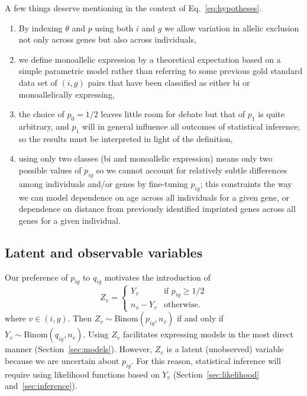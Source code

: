 \documentclass[letterpaper]{article}
\begin{document}
A few things deserve mentioning in the context of Eq.~\ref{eq:hypotheses}.
\begin{enumerate}
\item By indexing \(\theta\) and \(p\) using both \(i\) and \(g\) we allow variation
in allelic exclusion not only across genes but also across individuals,
\item we define monoallelic expression by a theoretical expectation based on a
simple parametric model rather than referring to some previous gold standard
data set of \((i,g)\) pairs that have been classified as either bi or monoallelically
expressing,
\item the choice of \(p_0=1/2\) leaves little room for debate but that of
\(p_1\) is quite arbitrary, and \(p_1\) will in general influence all outcomes of
statistical inference; so the results must be interpreted in light of the
definition,
\item using only two classes (bi and monoallelic expression) means only two possible
values of \(p_{ig}\) so we cannot account for  
relatively subtle differences among individuals and/or genes by fine-tuning
\(p_{ig}\); this constraints the way we can model dependence on age across all
individuals for a given gene, or dependence on distance from previously
identified imprinted genes across all genes for a given individual.
\end{enumerate}

\subsection{Latent and observable variables}

Our preference of \(p_{ig}\) to \(q_{ig}\) motivates the introduction
of
\begin{equation}
\label{eq:Z-def}
Z_v =
\begin{cases}
Y_v & \text{if } p_{ig} \ge 1/2 \\
n_v-Y_v & \text{otherwise}.
\end{cases}
\end{equation}
where \(v\in(i,g)\).
Then \(Z_v\sim\mathrm{Binom}(p_{ig},n_v)\) if and only if
\(Y_v\sim\mathrm{Binom}(q_{ig},n_v)\).  Using \(Z_v\) facilitates
expressing models in the most direct manner (Section~\ref{sec:models}).  However, \(Z_v\) is a latent
(unobserved) variable because we are uncertain about \(p_{ig}\).  For
this reason, statistical inference will require using likelihood functions
based on \(Y_v\) (Section~\ref{sec:likelihood} and~\ref{sec:inference}).
\end{document}
